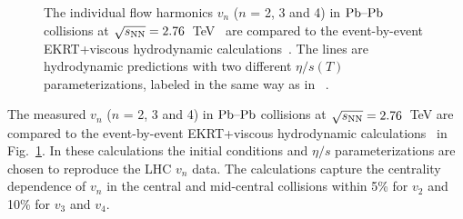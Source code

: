 \begin{figure}[h]
\begin{center}
        \caption{The individual flow harmonics $v_n$ ($n$ = 2, 3 and 4) in $\textnormal{Pb--Pb}$ collisions at $\sqrt{s_{\textnormal{NN}}}=2.76$~TeV~\cite{Adam:2016izf} are compared to the event-by-event EKRT+viscous hydrodynamic calculations~\cite{Niemi:2015qia}. The lines are hydrodynamic predictions with two different $\eta/s(T)$ parameterizations, labeled in the same way as in ~\cite{Niemi:2015qia}.}
        \label{fig:Figure_A1}
              \end{center}
\end{figure}

The measured $v_n$ ($n$ = 2, 3 and 4) in $\textnormal{Pb--Pb}$ collisions at $\sqrt{s_{\textnormal{NN}}}=2.76$~TeV are compared to the event-by-event EKRT+viscous hydrodynamic calculations~\cite{Niemi:2015qia} in Fig.~\ref{fig:Figure_A1}. In these calculations the initial conditions and $\eta/s$ parameterizations are chosen to reproduce the LHC $v_n$ data.
The calculations capture the centrality dependence of $v_n$ in the central and mid-central collisions within 5\% for $v_2$ and 10\% for $v_3$ and $v_4$.

